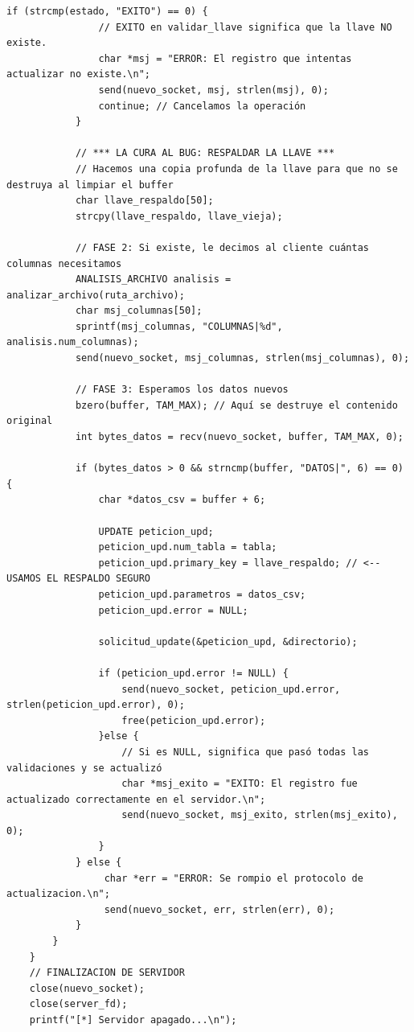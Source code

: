 \documentclass[12pt]{article}
\begin{document}
\begin{lstlisting}[style=estiloC ,title={Código 1. Servidor TCP (MAIN)}]
            if (strcmp(estado, "EXITO") == 0) {
                // EXITO en validar_llave significa que la llave NO existe.
                char *msj = "ERROR: El registro que intentas actualizar no existe.\n";
                send(nuevo_socket, msj, strlen(msj), 0);
                continue; // Cancelamos la operación
            }

            // *** LA CURA AL BUG: RESPALDAR LA LLAVE ***
            // Hacemos una copia profunda de la llave para que no se destruya al limpiar el buffer
            char llave_respaldo[50];
            strcpy(llave_respaldo, llave_vieja);

            // FASE 2: Si existe, le decimos al cliente cuántas columnas necesitamos
            ANALISIS_ARCHIVO analisis = analizar_archivo(ruta_archivo);
            char msj_columnas[50];
            sprintf(msj_columnas, "COLUMNAS|%d", analisis.num_columnas);
            send(nuevo_socket, msj_columnas, strlen(msj_columnas), 0);

            // FASE 3: Esperamos los datos nuevos
            bzero(buffer, TAM_MAX); // Aquí se destruye el contenido original
            int bytes_datos = recv(nuevo_socket, buffer, TAM_MAX, 0);

            if (bytes_datos > 0 && strncmp(buffer, "DATOS|", 6) == 0) {
                char *datos_csv = buffer + 6;
                
                UPDATE peticion_upd;
                peticion_upd.num_tabla = tabla;
                peticion_upd.primary_key = llave_respaldo; // <-- USAMOS EL RESPALDO SEGURO
                peticion_upd.parametros = datos_csv;    
                peticion_upd.error = NULL;

                solicitud_update(&peticion_upd, &directorio);
                
                if (peticion_upd.error != NULL) {
                    send(nuevo_socket, peticion_upd.error, strlen(peticion_upd.error), 0);
                    free(peticion_upd.error);
                }else {
                    // Si es NULL, significa que pasó todas las validaciones y se actualizó
                    char *msj_exito = "EXITO: El registro fue actualizado correctamente en el servidor.\n";
                    send(nuevo_socket, msj_exito, strlen(msj_exito), 0);
                }
            } else {
                 char *err = "ERROR: Se rompio el protocolo de actualizacion.\n";
                 send(nuevo_socket, err, strlen(err), 0);
            }
        }
    }
    // FINALIZACION DE SERVIDOR
    close(nuevo_socket);
    close(server_fd);
    printf("[*] Servidor apagado...\n");


\end{lstlisting}
\end{document}
